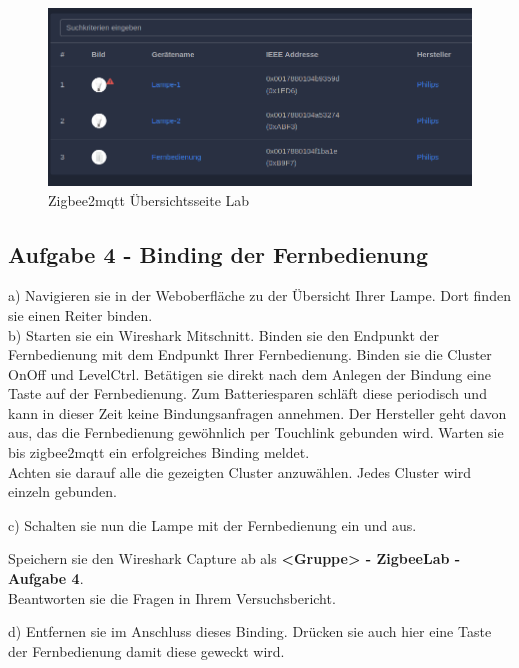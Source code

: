 \begin{figure}[H]
    \centering
    \includegraphics[width=1\textwidth]{media/z2m-ov.png}
    \caption{Zigbee2mqtt Übersichtsseite Lab}
\end{figure}


\subsection{Aufgabe 4 - Binding der Fernbedienung}

a) Navigieren sie in der Weboberfläche zu der Übersicht Ihrer Lampe. Dort finden sie einen Reiter \grqq binden\grqq{}. \\
b) Starten sie ein Wireshark Mitschnitt. Binden sie den Endpunkt der Fernbedienung mit dem Endpunkt Ihrer Fernbedienung. Binden sie die Cluster \grqq OnOff\grqq{}
und \grqq LevelCtrl\grqq{}. Betätigen sie direkt nach dem Anlegen der Bindung eine Taste auf der Fernbedienung. Zum Batteriesparen \grqq schläft\grqq{} diese 
periodisch und kann in dieser Zeit keine Bindungsanfragen annehmen. Der Hersteller geht davon aus, das die Fernbedienung gewöhnlich per Touchlink gebunden wird. 
Warten sie bis zigbee2mqtt ein erfolgreiches Binding meldet. \\



Achten sie darauf alle die gezeigten Cluster anzuwählen. Jedes Cluster wird einzeln gebunden.

c) Schalten sie nun die Lampe mit der Fernbedienung ein und aus. 

\begin{Hinweis}
    Speichern sie den Wireshark Capture ab als \textbf{\grqq <Gruppe> - ZigbeeLab - Aufgabe 4\grqq{}}. \\
    Beantworten sie die Fragen in Ihrem Versuchsbericht.
\end{Hinweis}

d) Entfernen sie im Anschluss dieses Binding. Drücken sie auch hier eine Taste der Fernbedienung damit diese geweckt wird.

